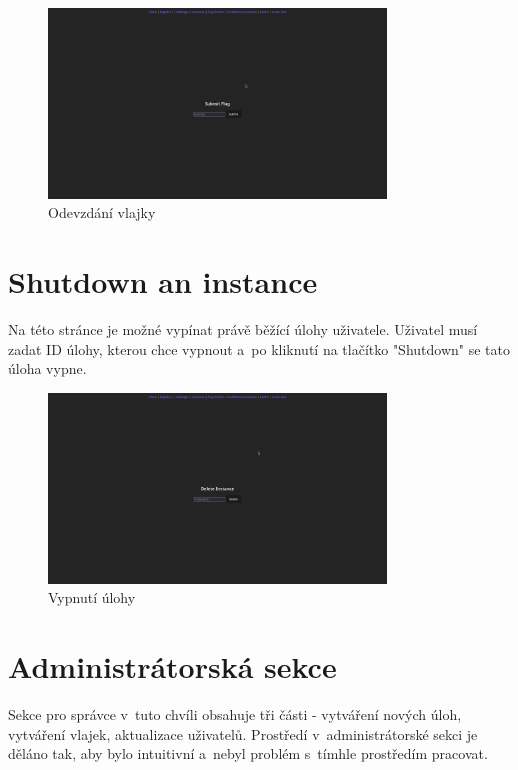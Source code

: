 \documentclass[12pt, a4paper,
oneside,      %
openright
]{report}
\begin{document}
\begin{figure}[h]
	\centering
	\includegraphics[width=0.8\textwidth]{05-flag.png}
	\caption{Odevzdání vlajky}
	\label{fig:frontend-flag-submit}
\end{figure}

\section{Shutdown an instance}
Na této stránce je možné vypínat právě běžící úlohy uživatele. Uživatel musí zadat ID úlohy, kterou chce vypnout a~po kliknutí na tlačítko "Shutdown" se tato úloha vypne.

\begin{figure}[h]
	\centering
	\includegraphics[width=0.8\textwidth]{06-shut.png}
	\caption{Vypnutí úlohy}
	\label{fig:frontend-shutdown}
\end{figure}

\section{Administrátorská sekce}
Sekce pro správce v~tuto chvíli obsahuje tři části - vytváření nových úloh, vytváření vlajek, aktualizace uživatelů. Prostředí v~administrátorské sekci je děláno tak, aby bylo intuitivní a~nebyl problém s~tímhle prostředím pracovat. 
\end{document}
